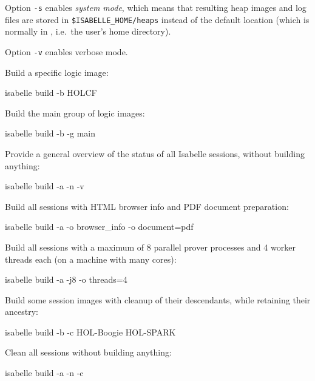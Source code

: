 \begin{isabellebody}
\begin{isamarkuptext}
  \medskip Option \verb|-s| enables \emph{system mode}, which
  means that resulting heap images and log files are stored in
  \verb|$ISABELLE_HOME/heaps| instead of the default location
  \hyperlink{setting.ISABELLE-OUTPUT}{\mbox{}} (which is normally in \hyperlink{setting.ISABELLE-HOME-USER}{\mbox{}}, i.e.\ the user's home directory).

  \medskip Option \verb|-v| enables verbose mode.%
\end{isamarkuptext}%
\isamarkuptrue%
%
\isamarkuptrue%
%
\begin{isamarkuptext}%
Build a specific logic image:
\begin{ttbox}
isabelle build -b HOLCF
\end{ttbox}

  \smallskip Build the main group of logic images:
\begin{ttbox}
isabelle build -b -g main
\end{ttbox}

  \smallskip Provide a general overview of the status of all Isabelle
  sessions, without building anything:
\begin{ttbox}
isabelle build -a -n -v
\end{ttbox}

  \smallskip Build all sessions with HTML browser info and PDF
  document preparation:
\begin{ttbox}
isabelle build -a -o browser_info -o document=pdf
\end{ttbox}

  \smallskip Build all sessions with a maximum of 8 parallel prover
  processes and 4 worker threads each (on a machine with many cores):
\begin{ttbox}
isabelle build -a -j8 -o threads=4
\end{ttbox}

  \smallskip Build some session images with cleanup of their
  descendants, while retaining their ancestry:
\begin{ttbox}
isabelle build -b -c HOL-Boogie HOL-SPARK
\end{ttbox}

  \smallskip Clean all sessions without building anything:
\begin{ttbox}
isabelle build -a -n -c
\end{ttbox}


\end{isamarkuptext}
\end{isabellebody}

